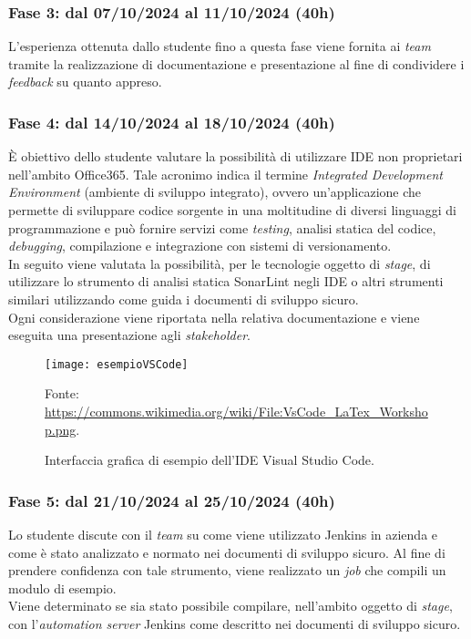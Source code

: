 \subsubsection*{Fase 3: dal 07/10/2024 al 11/10/2024 (40h) }
L'esperienza ottenuta dallo studente fino a questa fase viene fornita ai \emph{team} tramite la realizzazione di documentazione e presentazione al fine di condividere i \emph{feedback} su quanto appreso.\\

\subsubsection*{Fase 4: dal 14/10/2024 al 18/10/2024 (40h) }
È obiettivo dello studente valutare la possibilità di utilizzare IDE non proprietari nell'ambito Office365. Tale acronimo indica il termine \emph{Integrated Development Environment} (ambiente di sviluppo integrato), ovvero un'applicazione che permette di sviluppare codice sorgente in una moltitudine di diversi linguaggi di programmazione e può fornire servizi come \emph{testing}, analisi statica del codice, \emph{debugging}, compilazione e integrazione con sistemi di versionamento.\\ 
In seguito viene valutata la possibilità, per le tecnologie oggetto di \emph{stage}, di utilizzare lo strumento di analisi statica SonarLint negli IDE o altri strumenti similari utilizzando come guida i documenti di sviluppo sicuro.\\
Ogni considerazione viene riportata nella relativa documentazione e viene eseguita una presentazione agli \emph{stakeholder}.\\ 
\begin{figure}[htbp] 
    \centering 
    \texttt{[image: esempioVSCode]}
    \caption{Interfaccia grafica di esempio dell'IDE Visual Studio Code.} 
    \label{fig:esempioVSCode}
    \vspace{1mm}
    Fonte: \url{https://commons.wikimedia.org/wiki/File:VsCode_LaTex_Workshop.png}.
\end{figure}
\subsubsection*{Fase 5: dal 21/10/2024 al 25/10/2024 (40h) }
Lo studente discute con il \emph{team} su come viene utilizzato Jenkins in azienda e come è stato analizzato e normato nei documenti di sviluppo sicuro. Al fine di prendere confidenza con tale strumento, viene realizzato un \emph{job} che compili un modulo di esempio.\\
Viene determinato se sia stato possibile compilare, nell'ambito oggetto di \emph{stage}, con l'\emph{automation server} Jenkins come descritto nei documenti di sviluppo sicuro.\\

